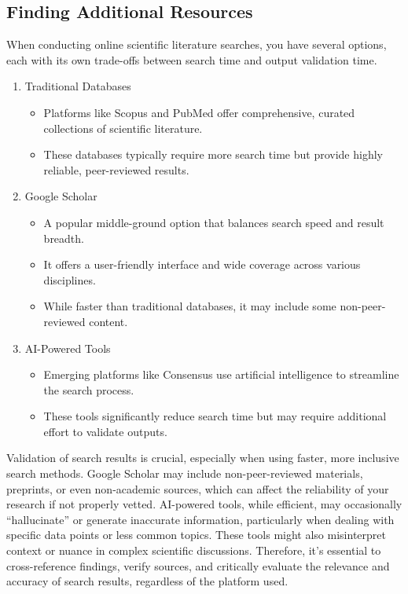 \documentclass[
  letterpaper,
  DIV=11,
  numbers=noendperiod]{scrreprt}
\providecommand{\tightlist}{%
  \setlength{\itemsep}{0pt}\setlength{\parskip}{0pt}}\usepackage{longtable,booktabs,array}
\begin{document}
\subsection{Finding Additional
Resources}\label{finding-additional-resources}

When conducting online scientific literature searches, you have several
options, each with its own trade-offs between search time and output
validation time.

\begin{enumerate}
\def\labelenumi{\arabic{enumi}.}
\tightlist
\item
  Traditional Databases

  \begin{itemize}
  \tightlist
  \item
    Platforms like Scopus and PubMed offer comprehensive, curated
    collections of scientific literature.
  \item
    These databases typically require more search time but provide
    highly reliable, peer-reviewed results.
  \end{itemize}
\item
  Google Scholar

  \begin{itemize}
  \tightlist
  \item
    A popular middle-ground option that balances search speed and result
    breadth.
  \item
    It offers a user-friendly interface and wide coverage across various
    disciplines.
  \item
    While faster than traditional databases, it may include some
    non-peer-reviewed content.
  \end{itemize}
\item
  AI-Powered Tools

  \begin{itemize}
  \tightlist
  \item
    Emerging platforms like Consensus use artificial intelligence to
    streamline the search process.
  \item
    These tools significantly reduce search time but may require
    additional effort to validate outputs.
  \end{itemize}
\end{enumerate}

Validation of search results is crucial, especially when using faster,
more inclusive search methods. Google Scholar may include
non-peer-reviewed materials, preprints, or even non-academic sources,
which can affect the reliability of your research if not properly
vetted. AI-powered tools, while efficient, may occasionally
``hallucinate'' or generate inaccurate information, particularly when
dealing with specific data points or less common topics. These tools
might also misinterpret context or nuance in complex scientific
discussions. Therefore, it's essential to cross-reference findings,
verify sources, and critically evaluate the relevance and accuracy of
search results, regardless of the platform used.
\end{document}
